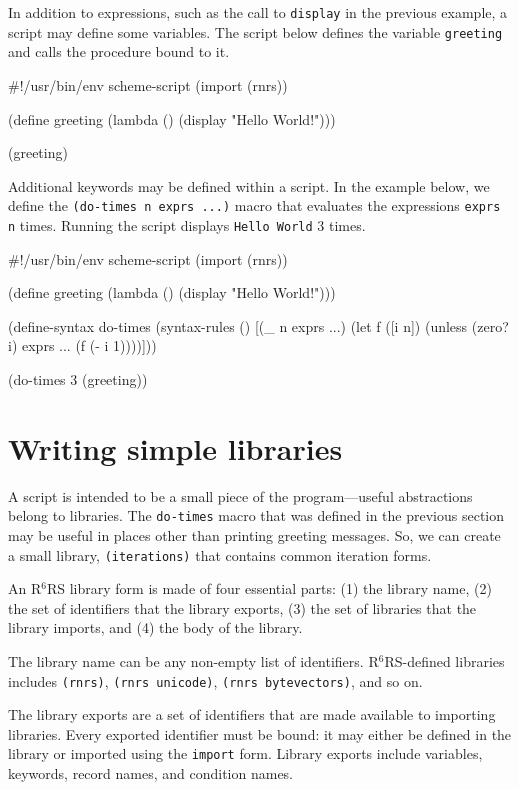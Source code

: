 \documentclass[onecolumn, 12pt, twoside, openright, dvipdfm]{book}
\newcommand{\rnrs}[1]{R$^{\mathrm{#1}}$RS}
\begin{document}
In addition to expressions, such as the call to \texttt{display} in
the previous example, a script may define some variables.  The
script below defines the variable \texttt{greeting} and calls the
procedure bound to it.

\begin{CodeInline}
#!/usr/bin/env scheme-script
(import (rnrs))

(define greeting
  (lambda ()
    (display "Hello World!\n")))

(greeting)
\end{CodeInline}

Additional keywords may be defined within a script.  In the example
below, we define the \texttt{(do-times n exprs ...)} macro that
evaluates the expressions \texttt{exprs} \texttt{n} times.  Running
the script displays \texttt{Hello World} 3 times.
\newpage

\begin{CodeInline}
#!/usr/bin/env scheme-script
(import (rnrs))

(define greeting
  (lambda ()
    (display "Hello World!\n")))

(define-syntax do-times
  (syntax-rules ()
    [(_ n exprs ...)
     (let f ([i n])
       (unless (zero? i)
         exprs ...
         (f (- i 1))))]))

(do-times 3 (greeting))
\end{CodeInline}


\section{Writing simple libraries}

A script is intended to be a small piece of the program---useful
abstractions belong to libraries.  The \texttt{do-times} macro that
was defined in the previous section may be useful in places other
than printing greeting messages.  So, we can create a small library,
\texttt{(iterations)} that contains common iteration forms.  

An \rnrs{6} library form is made of four essential parts: (1) the
library name, (2) the set of identifiers that the library exports,
(3) the set of libraries that the library imports, and (4) the body
of the library.  


The library name can be any non-empty list of identifiers.
\rnrs{6}-defined libraries includes \texttt{(rnrs)},
\texttt{(rnrs~unicode)}, \texttt{(rnrs~bytevectors)}, and so on.

The library exports are a set of identifiers that are made available
to importing libraries.  Every exported identifier must be bound: it
may either be defined in the library or imported using the
\texttt{import} form.  Library exports include variables, keywords,
record names, and condition names.
\end{document}
